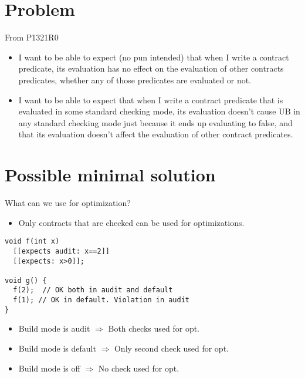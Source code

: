 \section{Problem}

\begin{frame}[t]{From P1321R0}
\begin{itemize}
\item
I want to be able to expect (no pun intended) that when I write a contract predicate, its evaluation has no effect on the evaluation of other contracts predicates, whether any of those predicates are evaluated or not.

\vfill
\item
I want to be able to expect that when I write a contract predicate that is evaluated in some standard checking mode, its evaluation doesn't cause UB in any standard checking mode just because it ends up evaluating to false, and that its evaluation doesn't affect the evaluation of other contract predicates.

\end{itemize}
\end{frame}

\section{Possible minimal solution}

\begin{frame}[t,fragile]{What can we use for optimization?}
\begin{itemize}
\item Only contracts that are checked can be used for optimizations.
\end{itemize}
\begin{lstlisting}
void f(int x)
  [[expects audit: x==2]]
  [[expects: x>0]];

void g() {
  f(2);  // OK both in audit and default
  f(1); // OK in default. Violation in audit
}
\end{lstlisting}
\begin{itemize}
  \item Build mode is audit $\Rightarrow$ Both checks used for opt.
  \item Build mode is default $\Rightarrow$ Only second check used for opt.
  \item Build mode is off $\Rightarrow$ No check used for opt.
\end{itemize}
\end{frame}

